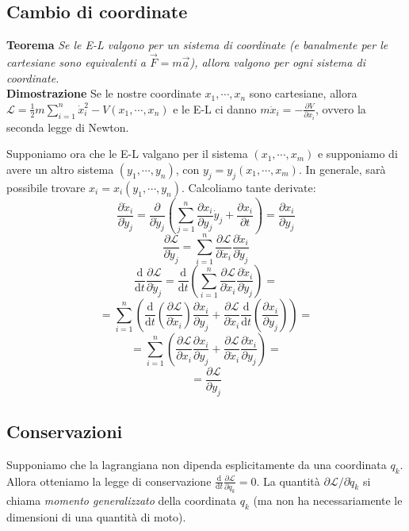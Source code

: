 \documentclass[a4paper,11pt]{article}
\begin{document}
\subsection{Cambio di coordinate}

\textbf{\large Teorema} \textit{Se le E-L valgono per un sistema di coordinate (e banalmente per le cartesiane sono equivalenti a $\vec{F}=m\vec{a}$), allora valgono per ogni sistema di coordinate.}\\
\textbf{Dimostrazione}
\noindent Se le nostre coordinate $x_1,\cdots,x_n$ sono cartesiane, allora $\mathcal{L}=\frac{1}{2}m\sum_{i=1}^{n}\dot{x}_i^2-V(x_1,\cdots,x_n)$ e le E-L ci danno $m\ddot{x}_i=-\frac{\partial V}{\partial x_i}$, ovvero la seconda legge di Newton.

\noindent Supponiamo ora che le E-L valgano per il sistema $(x_1,\cdots,x_m)$ e supponiamo di avere un altro sistema $(y_1,\cdots,y_n)$, con $y_j=y_j(x_1,\cdots,x_m)$. In generale, sarà possibile trovare $x_i=x_i(y_1,\cdots, y_n)$. Calcoliamo tante derivate:
$$\frac{\partial\dot{x}_i}{\partial\dot{y}_j}=\frac{\partial}{\partial\dot{y}_j}\left(\sum_{j=1}^{n}\frac{\partial x_i}{\partial y_j}\dot{y}_j+\frac{\partial x_i}{\partial t}\right)=\frac{\partial x_i}{\partial y_j}$$ $$\frac{\partial\mathcal{L}}{\partial\dot{y}_j}=\sum_{i=1}^{n}\frac{\partial\mathcal{L}}{\partial\dot{x}_i}\frac{\partial\dot{x}_i}{\partial\dot{y}_j}$$ $$ \frac{\mathrm{d}}{\mathrm{d}t}\frac{\partial\mathcal{L}}{\partial\dot{y}_j}=\frac{\mathrm{d}}{\mathrm{d}t}\left(\sum_{i=1}^{n}\frac{\partial\mathcal{L}}{\partial\dot{x}_i}\frac{\partial\dot{x}_i}{\partial\dot{y}_j}\right)=$$ $$ =\sum_{i=1}^{n}\left(\frac{\mathrm{d}}{\mathrm{d}t}\left(\frac{\partial\mathcal{L}}{\partial \dot{x}_i}\right)\frac{\partial x_i}{\partial y_j}+\frac{\partial\mathcal{L}}{\partial \dot{x}_i}\frac{\mathrm{d}}{\mathrm{d}t}\left(\frac{\partial x_i}{\partial y_j}\right)\right)=$$ $$=\sum_{i=1}^{n}\left(\frac{\partial\mathcal{L}}{\partial x_i}\frac{\partial x_i}{\partial y_j}+\frac{\partial\mathcal{L}}{\partial\dot{x}_i}\frac{\partial\dot{x}_i}{\partial y_j}\right)=$$ $$=\frac{\partial\mathcal{L}}{\partial y_j}$$
\subsection{Conservazioni}
Supponiamo che la lagrangiana non dipenda esplicitamente da una coordinata $q_k$. Allora otteniamo la legge di conservazione
$\frac{\mathrm{d}}{\mathrm{d}t}\frac{\partial\mathcal{L}}{\partial\dot{q}_k}=0$.
La quantità $\partial\mathcal{L}/\partial\dot{q}_k$ si chiama \textit{momento generalizzato} della coordinata $q_k$ (ma non ha necessariamente le dimensioni di una quantità di moto).
\end{document}
